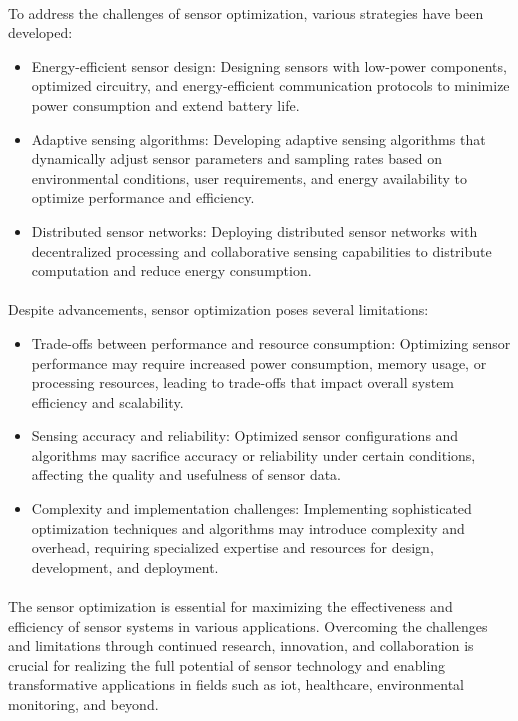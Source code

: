         \paragraph{}
        To address the challenges of sensor optimization, various strategies have been developed:
        \begin{itemize}
            \item Energy-efficient sensor design: Designing sensors with low-power components, optimized circuitry, and energy-efficient communication protocols to minimize power consumption and extend battery life.
            \item Adaptive sensing algorithms: Developing adaptive sensing algorithms that dynamically adjust sensor parameters and sampling rates based on environmental conditions, user requirements, and energy availability to optimize performance and efficiency.
            \item Distributed sensor networks: Deploying distributed sensor networks with decentralized processing and collaborative sensing capabilities to distribute computation and reduce energy consumption.
        \end{itemize}

        \paragraph{}
        Despite advancements, sensor optimization poses several limitations:
        \begin{itemize}
            \item Trade-offs between performance and resource consumption: Optimizing sensor performance may require increased power consumption, memory usage, or processing resources, leading to trade-offs that impact overall system efficiency and scalability.
            \item Sensing accuracy and reliability: Optimized sensor configurations and algorithms may sacrifice accuracy or reliability under certain conditions, affecting the quality and usefulness of sensor data.
            \item Complexity and implementation challenges: Implementing sophisticated optimization techniques and algorithms may introduce complexity and overhead, requiring specialized expertise and resources for design, development, and deployment.
        \end{itemize}

        \paragraph{}
       The sensor optimization is essential for maximizing the effectiveness and efficiency of sensor systems in various applications. Overcoming the challenges and limitations through continued research, innovation, and collaboration is crucial for realizing the full potential of sensor technology and enabling transformative applications in fields such as \gls{iot}, healthcare, environmental monitoring, and beyond.
        

